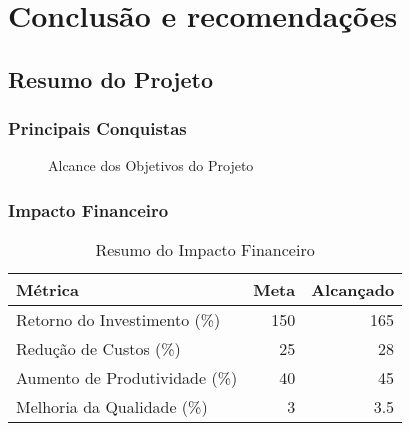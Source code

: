 \documentclass[12pt,a4paper]{report}
\begin{document}
\chapter{Conclusão e recomendações}

\section{Resumo do Projeto}
\subsection{Principais Conquistas}
\begin{figure}[H]
\centering
{}
\caption{Alcance dos Objetivos do Projeto}
\label{fig:objectives-achievement}
\end{figure}
\subsection{Impacto Financeiro}
\begin{table}[H]
\centering
\caption{Resumo do Impacto Financeiro}
\label{tab:financial-summary}
\begin{tabular}{@{}lrr@{}}
\toprule
Métrica & Meta & Alcançado \\
\midrule
Retorno do Investimento (\%) & 150 & 165 \\
Redução de Custos (\%) & 25 & 28 \\
Aumento de Produtividade (\%) & 40 & 45 \\
Melhoria da Qualidade (\%) & 3 & 3.5 \\
\bottomrule
\end{tabular}
\end{table}
\end{document}
